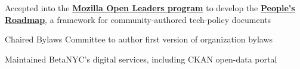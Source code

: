 \documentclass[letterpaper]{deedy-resume} %
\begin{document}
\begin{minipage}[t]{0.66\textwidth}



\begin{tightitemize}
  \item Accepted into the \href{https://mozilla.github.io/leadership-training/}{\textbf{Mozilla Open Leaders program}} to develop the \textbf{\href{http://nycroadmap.us}{People's Roadmap}}, a framework for community-authored tech-policy documents
  \item Chaired Bylaws Committee to author first version of organization bylaws
  \item Maintained BetaNYC's digital services, including CKAN open-data portal
\end{tightitemize}

\sectionspace %









\end{minipage}
\end{document}
